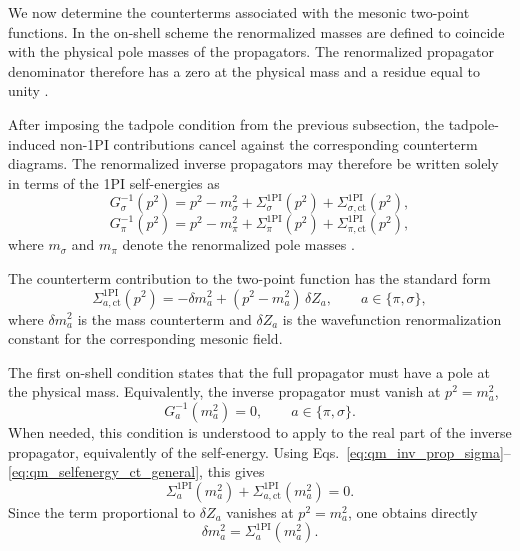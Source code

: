 We now determine the counterterms associated with the mesonic
two-point functions. In the on-shell scheme the renormalized masses
are defined to coincide with the physical pole masses of the
propagators. The renormalized propagator denominator therefore has
a zero at the physical mass and a residue equal to unity
\cite{PeskinSchroeder1995,WeinbergQFT,Folkestad2018,Andersen2024}.

After imposing the tadpole condition from the previous subsection,
the tadpole-induced non-1PI contributions cancel against the
corresponding counterterm diagrams. The renormalized inverse
propagators may therefore be written solely in terms of the 1PI
self-energies as
\begin{equation}
G_\sigma^{-1}(p^2)
=
p^2 - m_\sigma^2
+ \Sigma_\sigma^{\mathrm{1PI}}(p^2)
+ \Sigma_{\sigma,\mathrm{ct}}^{\mathrm{1PI}}(p^2),
\label{eq:qm_inv_prop_sigma}
\end{equation}
\begin{equation}
G_\pi^{-1}(p^2)
=
p^2 - m_\pi^2
+ \Sigma_\pi^{\mathrm{1PI}}(p^2)
+ \Sigma_{\pi,\mathrm{ct}}^{\mathrm{1PI}}(p^2),
\label{eq:qm_inv_prop_pi}
\end{equation}
where \(m_\sigma\) and \(m_\pi\) denote the renormalized pole masses \cite{Folkestad2018}.

The counterterm contribution to the two-point function has the
standard form
\begin{equation}
\Sigma_{a,\mathrm{ct}}^{\mathrm{1PI}}(p^2)
=
-\delta m_a^2
+
(p^2-m_a^2)\,\delta Z_a,
\qquad
a\in\{\pi,\sigma\},
\label{eq:qm_selfenergy_ct_general}
\end{equation}
where \(\delta m_a^2\) is the mass counterterm and \(\delta Z_a\) is
the wavefunction renormalization constant for the corresponding
mesonic field.

The first on-shell condition states that the full propagator must have
a pole at the physical mass. Equivalently, the inverse propagator must
vanish at \(p^2=m_a^2\),
\begin{equation}
G_a^{-1}(m_a^2)=0,
\qquad
a\in\{\pi,\sigma\}.
\label{eq:qm_OS_pole_condition}
\end{equation}
When needed, this condition is understood to apply to the real part
of the inverse propagator, equivalently of the self-energy.
Using Eqs.~\eqref{eq:qm_inv_prop_sigma}--\eqref{eq:qm_selfenergy_ct_general},
this gives
\begin{equation}
\Sigma_a^{\mathrm{1PI}}(m_a^2)
+
\Sigma_{a,\mathrm{ct}}^{\mathrm{1PI}}(m_a^2)
=0.
\end{equation}
Since the term proportional to \(\delta Z_a\) vanishes at
\(p^2=m_a^2\), one obtains directly
\begin{equation}
\delta m_a^2
=
\Sigma_a^{\mathrm{1PI}}(m_a^2).
\label{eq:qm_delta_ma_general}
\end{equation}


